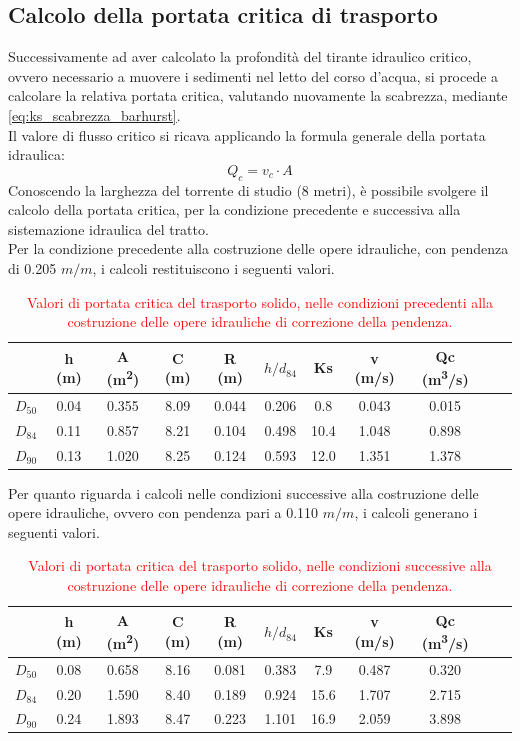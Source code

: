 \subsection{Calcolo della portata critica di trasporto}
Successivamente ad aver calcolato la profondità del tirante idraulico critico, ovvero necessario a muovere i sedimenti nel letto del corso d'acqua, si procede a calcolare la relativa portata critica, valutando nuovamente la scabrezza, mediante \eqref{eq:ks_scabrezza_barhurst}.\\
Il valore di flusso critico si ricava applicando la formula generale della portata idraulica:
\begin{equation}
    Q_c = v_c \cdot A
\end{equation}
Conoscendo la larghezza del torrente di studio (8 metri), è possibile svolgere il calcolo della portata critica, per la condizione precedente e successiva alla sistemazione idraulica del tratto.\\
Per la condizione precedente alla costruzione delle opere idrauliche, con pendenza di 0.205 $m/m$, i calcoli restituiscono i seguenti valori.
\begin{table}[H] \centering
\caption{\textcolor{red}{Valori di portata critica del trasporto solido, nelle condizioni precedenti alla costruzione delle opere idrauliche di correzione della pendenza.}}
\begin{tabular}{ccccccccccc}
\toprule
& h (m) & A (\unit{m^2})& C (m) & R (m) & $h/d_{84}$ & Ks& v (m/s)& Qc (\unit{m^3/s}) \\
\midrule
$D_{50}$& 0.04 & 0.355 & 8.09  & 0.044 & 0.206 & 0.8  & 0.043 & 0.015 \\
$D_{84}$ & 0.11 & 0.857 & 8.21 & 0.104 & 0.498 & 10.4 & 1.048   & 0.898 \\
$D_{90}$ & 0.13  & 1.020  & 8.25 & 0.124 & 0.593 & 12.0 & 1.351 & 1.378 \\
\bottomrule
\end{tabular}
\end{table}

Per quanto riguarda i calcoli nelle condizioni successive alla costruzione delle opere idrauliche, ovvero con pendenza pari a 0.110 $m/m$, i calcoli generano i seguenti valori.
\begin{table}[H] \centering
\caption{\textcolor{red}{Valori di portata critica del trasporto solido, nelle condizioni successive alla costruzione delle opere idrauliche di correzione della pendenza.}}
\begin{tabular}{ccccccccccc}
\toprule
& h (m) & A (\unit{m^2}) & C (m) & R (m) & $h/d_{84}$ & Ks& v (m/s)& Qc (\unit{m^3/s})\\
\midrule
$D_{50}$& 0.08  & 0.658  & 8.16  & 0.081 & 0.383 & 7.9 & 0.487 & 0.320\\
$D_{84}$ & 0.20 & 1.590  & 8.40  & 0.189 & 0.924 & 15.6 & 1.707 & 2.715 \\
$D_{90}$ & 0.24  & 1.893  & 8.47 & 0.223 & 1.101 & 16.9 & 2.059 & 3.898 \\
\bottomrule
\end{tabular}
\end{table}

